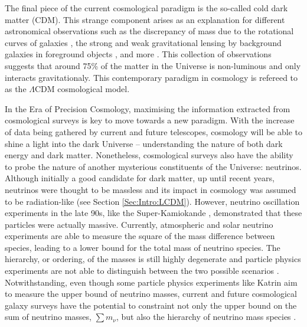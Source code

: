 \qquad The final piece of the current cosmological paradigm is the so-called cold dark matter (CDM). This strange component arises as an explanation for different astronomical observations such as the discrepancy of mass due to the rotational curves of galaxies \citep{1970Rubin}, the strong and weak gravitational lensing by background galaxies in foreground objects \citep{2006BulletCluster}, and more \citep{DarkMatterReview1993}. This collection of observations suggests that around 75\% of the matter in the Universe is non-luminous and only interacts gravitationaly. This contemporary paradigm in cosmology is refereed to as the $\Lambda$CDM cosmological model.

\qquad In the Era of Precision Cosmology, maximising the information extracted from cosmological surveys is key to move towards a new paradigm. With the increase of data being gathered by current and future telescopes, cosmology will be able to shine a light into the dark Universe -- understanding the nature of both dark energy and dark matter. Nonetheless, cosmological surveys also have the ability to probe the nature of another mysterious constituents of the Universe: neutrinos. Although initially a good candidate for dark matter, up until recent years, neutrinos were thought to be massless and its impact in cosmology was assumed to be radiation-like (see Section \ref{Sec:Intro:LCDM}). However, neutrino oscillation experiments in the late 90s, like the Super-Kamiokande \citep{Kamiokande1998}, demonstrated that these particles were actually massive. Currently, atmospheric and solar neutrino experiments are able to measure the square of the mass difference between species, leading to a lower bound for the total mass of neutrino species. The hierarchy, or ordering, of the masses is still highly degenerate and particle physics experiments are not able to distinguish between the two possible scenarios \citep{2014Gonzalez-GarciaNeutrino}. Notwithstanding, even though some particle physics experiments like Katrin \citep{2018Katrin} aim to measure the upper bound of neutrino masses, current and future cosmological galaxy surveys have the potential to constraint not only the upper bound on the sum of neutrino masses, $\sum m_{\nu}$, but also the hierarchy of neutrino mass species \citep{2003HannestadNeutrino, 2007FBA,2016JCAP...11..035H}.

